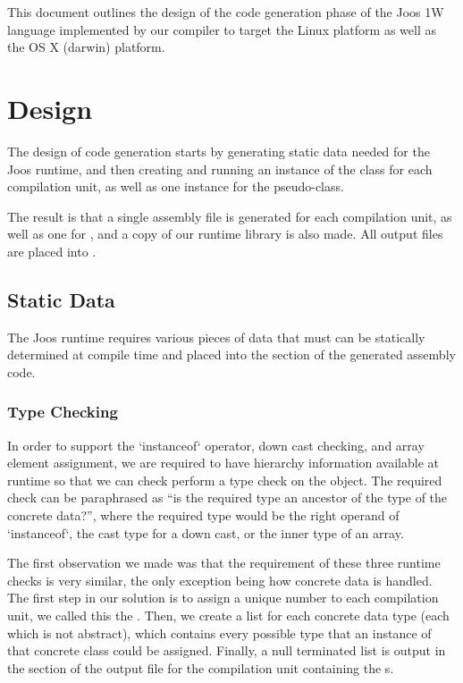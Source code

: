\documentclass[pdftex,10pt,a4paper]{article}
\begin{document}

This document outlines the design of the code generation phase of
the Joos 1W language implemented by our compiler to target the
 Linux platform as well as the  OS X (darwin)
platform.


\section{Design}

The design of code generation starts by generating static data needed
for the Joos runtime, and then creating and running an instance of the
 class for each compilation unit, as well as one
instance for the  pseudo-class.

The result is that a single assembly file is generated for each
compilation unit, as well as one for , and a copy of our
runtime library is also made. All output files are placed into
.


\subsection{Static Data}

The Joos runtime requires various pieces of data that must can be
statically determined at compile time and placed into the 
section of the generated assembly code.

\subsubsection{Type Checking}

In order to support the `instanceof` operator, down cast checking, and
array element assignment, we are required to have hierarchy information
available at runtime so that we can check perform a type check on the
object. The required check can be paraphrased as ``is the required
type an ancestor of the type of the concrete data?'', where the
required type would be the right operand of `instanceof`, the cast
type for a down cast, or the inner type of an array.

The first observation we made was that the requirement of these three
runtime checks is very similar, the only exception being how
 concrete data is handled. The first step in our solution is
to assign a unique number to each compilation unit, we called this the
. Then, we create a list for each concrete data
type (each  which is not abstract), which contains every
possible type that an instance of that concrete class could be
assigned. Finally, a null terminated list is output in the 
section of the output file for the compilation unit containing the
s.
\end{document}
